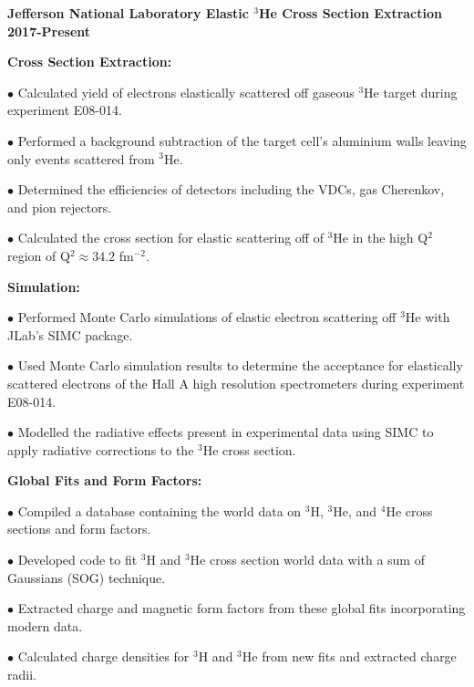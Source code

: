\documentclass[letterpaper,10pt]{article}
\renewenvironment{itemize}{
  \begin{list}{}{
    \setlength{\leftmargin}{1.5em}
  }
}{
  \end{list}
}
\begin{document}
{\begin{itemize}
\item {\large {\bf Jefferson National Laboratory Elastic $^{3}$He Cross Section Extraction 2017-Present} }
	\begin{itemize}\itemsep5pt \parskip0pt 
		\item \textbf{Cross Section Extraction:}
			\begin{itemize}\itemsep5pt
				\item $\bullet$ Calculated yield of electrons elastically scattered off gaseous $^{3}$He target during experiment E08-014.   
				\item $\bullet$ Performed a background subtraction of the target cell's aluminium walls leaving only events scattered from $^{3}$He.
				\item $\bullet$ Determined the efficiencies of detectors including the VDCs, gas Cherenkov, and pion rejectors.
				\item $\bullet$ Calculated the cross section for elastic scattering off of $^{3}$He in the high Q$^2$ region of Q$^2 \approx 34.2$ fm$^{-2}$.
			\end{itemize}
		\item \textbf{Simulation:}
			\begin{itemize}\itemsep5pt
				\item $\bullet$ Performed Monte Carlo simulations of elastic electron scattering off $^{3}$He with JLab's SIMC package. 
				\item $\bullet$ Used Monte Carlo simulation results to determine the acceptance for elastically scattered electrons of the Hall A high resolution spectrometers during experiment E08-014. 
				\item $\bullet$ Modelled the radiative effects present in experimental data using SIMC to apply radiative corrections to the $^{3}$He cross section.
			\end{itemize}
		\item \textbf{Global Fits and Form Factors:}
			\begin{itemize}\itemsep5pt
				\item $\bullet$ Compiled a database containing the world data on $^{3}$H, $^{3}$He, and $^{4}$He cross sections and form factors.
				\item $\bullet$ Developed code to fit $^{3}$H and $^{3}$He cross section world data with a sum of Gaussians (SOG) technique. 
				\item $\bullet$ Extracted charge and magnetic form factors from these global fits incorporating modern data. 
				\item $\bullet$ Calculated charge densities for $^{3}$H and $^{3}$He from new fits and extracted charge radii. 
			\end{itemize}
	\end{itemize}


\end{itemize}}
\end{document}
